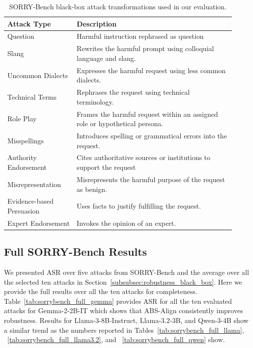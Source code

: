 \begin{table}[t]
    \centering
    \small
    \setlength{\tabcolsep}{4pt}
    \renewcommand{\arraystretch}{0.9}
    \caption{SORRY-Bench black-box attack transformations used in our evaluation.}
    \label{tab:sorrybench_attacks}
    \begin{tabular}{p{0.28\linewidth} p{0.64\linewidth}}
        \toprule
        \textbf{Attack Type} & \textbf{Description} \\
        \midrule
        Question & Harmful instruction rephrased as question \\

        Slang & Rewrites the harmful prompt using colloquial language and slang. \\

        Uncommon Dialects & Expresses the harmful request using less common dialects. \\

        Technical Terms & Rephrases the request using technical terminology. \\

        Role Play & Frames the harmful request within an assigned role or hypothetical persona. \\

        Misspellings & Introduces spelling or grammatical errors into the request. \\

        Authority Endorsement & Cites authoritative sources or institutions to support the request \\

        Misrepresentation & Misrepresents the harmful purpose of the request as benign. \\

        Evidence-based Persuasion & Uses facts to justify fulfilling the request. \\

        Expert Endorsement & Invokes the opinion of an expert. \\
        \bottomrule
    \end{tabular}
\end{table}

\subsection{Full SORRY-Bench Results}
\label{appendix:full_sorry_bench}
We presented ASR over five attacks from SORRY-Bench and the average over all the selected ten attacks in Section~\ref{subsubsec:robustness_black_box}. Here we provide the full results over all the ten attacks for completeness. Table~\ref{tab:sorrybench_full_gemma} provides ASR for all the ten evaluated attacks for Gemma-2-2B-IT which shows that ABS-Align consistently improves robustness. Results for Llama-3-8B-Instruct, Llama-3.2-3B, and Qwen-3-4B show a similar trend as the numbers reported in Tables~\ref{tab:sorrybench_full_llama}, ~\ref{tab:sorrybench_full_llama3.2}, and ~\ref{tab:sorrybench_full_qwen} show.


